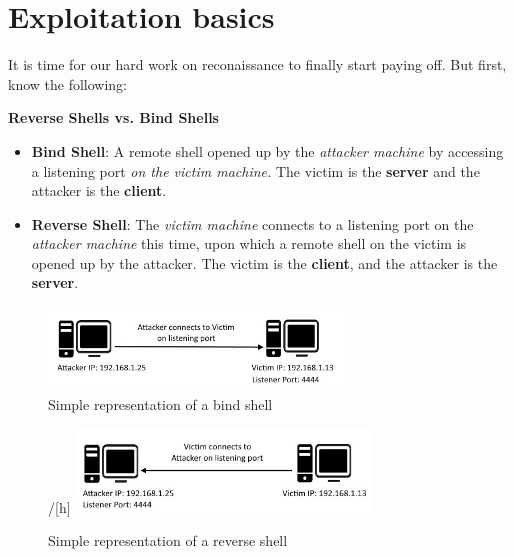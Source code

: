 \documentclass[a4paper,11pt]{article}
\begin{document}
\section{Exploitation basics}
\normalsize It is time for our hard work on reconaissance to finally start paying off. But first, know the following:
\\
\begin{center}
{\bfseries Reverse Shells vs. Bind Shells}
\end{center}
\begin{itemize}
    \item {\bfseries Bind Shell}: A remote shell opened up by the \textit{attacker machine} by accessing a listening port \textit{on the victim machine.} The victim is the {\bfseries server} and the attacker is the {\bfseries client}.
    \item {\bfseries Reverse Shell}: The \textit{victim machine} connects to a listening port on the \textit{attacker machine} this time, upon which a remote shell on the victim is opened up by the attacker. The victim is the {\bfseries client}, and the attacker is the {\bfseries server}.
\end{itemize}

\begin{figure}[h]
    \centering
    \includegraphics[width=0.7\textwidth]{images/bindshell.jpg}
    \caption{Simple representation of a bind shell}
\end{figure}

\begin{figure}/[h]
    \centering
    \includegraphics[width=0.7\textwidth]{images/reverseshell.jpg}
    \caption{Simple representation of a reverse shell}
\end{figure}
\end{document}
